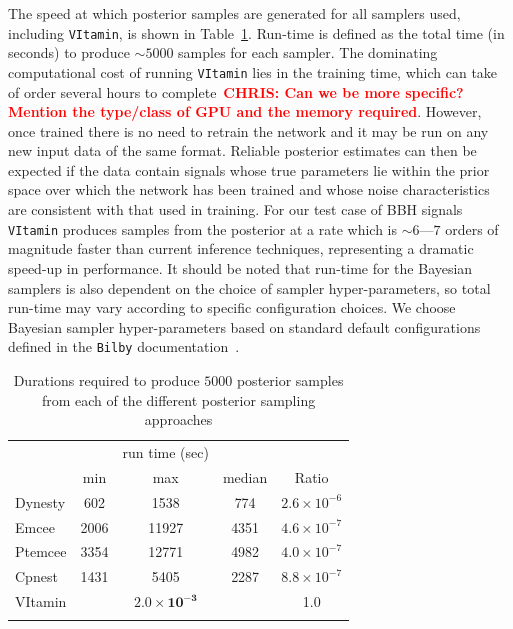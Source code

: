 \documentclass[%
showpacs,
 amsmath,amssymb,
 aps,
 twocolumn,
 prl,
 reprint,
floatfix,
]{revtex4-1}
\newcommand{\chris}[1]{\textbf{\textcolor{red}{CHRIS: #1}}}
\begin{document}
%
%
The speed at which posterior samples are generated for all samplers used,
including \texttt{VItamin}, is shown in Table~\ref{Tab:speed}. Run-time is
defined as the total time (in seconds) to produce $\sim 5000$ samples for each
sampler. The dominating computational cost of running \texttt{VItamin} lies in
the training time, which can take of order several hours to complete~\chris{Can
we be more specific? Mention the type/class of GPU and the memory required}.
However, once trained there is no need to retrain the network and it may be run
on any new input data of the same format. Reliable posterior estimates can then
be expected if the data contain signals whose true parameters lie within the
prior space over which the network has been trained and whose noise
characteristics are consistent with that used in training. For our test case of
\ac{BBH} signals \texttt{VItamin} produces samples from the posterior at a rate
which is $\sim 6$---$7$ orders of magnitude faster than current inference
techniques, representing a dramatic speed-up in performance. It should be noted
that run-time for the Bayesian samplers is also dependent on the choice of
sampler hyper-parameters, so total run-time may vary according to specific
configuration choices. We choose Bayesian sampler hyper-parameters based on
standard default configurations defined in the \texttt{Bilby}
documentation~\cite{1811.02042}. 
 


%
% 
\begin{table}
\centering
\caption{Durations required to produce $5000$ posterior samples from each of
the different posterior sampling approaches}
\begin{tabular}[t]{lcccc}
\toprule
& & run time (sec) & & \\
& min & max & median & Ratio \\
\hline\vspace{0.1cm}
Dynesty & 602 & 1538 & 774 & $2.6\times 10^{-6}$ \\
Emcee & 2006 & 11927 & 4351 & $4.6\times 10^{-7}$ \\
Ptemcee & 3354 & 12771 & 4982 & $4.0\times 10^{-7}$ \\
Cpnest & 1431 & 5405 & 2287 & $8.8\times 10^{-7}$ \\
\hline
VItamin & & $\bm{2.0\times 10^{-3}}$ & & 1.0 \\
\botrule
\end{tabular}
\label{Tab:speed}
\end{table}
\end{document}
